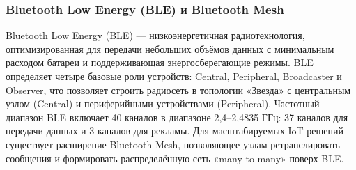 \documentclass[a4paper,12pt]{article}
\begin{document}
\subsubsection{Bluetooth Low Energy (BLE) и Bluetooth Mesh}

Bluetooth Low Energy (BLE) — низкоэнергетичная радиотехнология, оптимизированная для передачи небольших объёмов данных с минимальным расходом батареи и поддерживающая энергосберегающие
режимы. BLE определяет четыре базовые роли устройств: Central, Peripheral, Broadcaster и Observer, что позволяет строить радиосеть в топологии «Звезда» с центральным узлом (Central) и периферийными устройствами (Peripheral).
Частотный диапазон BLE включает 40 каналов в диапазоне 2,4–2,4835 ГГц: 37 каналов для передачи данных и 3 каналов для рекламы. Для масштабируемых IoT-решений существует расширение Bluetooth Mesh, позволяющее узлам ретранслировать
сообщения и формировать распределённую сеть «many-to-many» поверх BLE.
\end{document}

